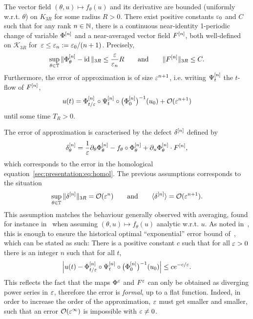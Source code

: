 \begin{assumption} \label{hyp:exist_avg_nl} %
  The vector field $(\theta , u) \mapsto f_\theta(u)$ and its derivative
  are bounded (uniformly w.r.t. $\theta$) on $K_{3R}$ for some radius $R >
  0$. There exist positive constants $\varepsilon_0$ and $C$ such that for
  any rank $n \in \mathbb{N}$, there is a continuous near-identity 1-periodic
  change of variable $\Phi^{[n]}$ and a near-averaged vector field $F^{[n]}$, both well-defined on $\mathcal{K}_{3R}$ for~$\varepsilon \leq \varepsilon_n :=
  \varepsilon_0 / (n+1)$. Precisely,
  \begin{equation*}
    \sup_{\theta \in \mathbb{T}} \| \Phi^{[n]}_\theta - \operatorname{id} \| _{3R} 
      \leq \frac{\varepsilon}{\varepsilon_n} R
    \qquad\text{and}\qquad
    \| F^{[n]} \|_{3R} \leq C .
  \end{equation*}
  Furthermore, the error of approximation is of size $\varepsilon^{n+1}$, i.e.
  writing $\Psi^{[n]} _t$ the $t$-flow of $F^{[n]}$, 
  \begin{equation} \label{sec:approx:def:avg_approx}
    u(t) = \Phi^{[n]} _{t/\varepsilon} \circ \Psi^{[n]} _t \circ \big( \Phi^{[n]} _0
    \big)^{-1} (u_0) + \mathcal{O}(\varepsilon^{n+1}) 
  \end{equation}
  until some time $T_R > 0$. 
\end{assumption}
The error of approximation is caracterised by the defect $\delta^{[n]}$
defined by 
\begin{equation*} 
  \delta^{[n]} _{\theta} 
  = \frac{1}{\varepsilon} \partial_\theta \Phi^{[n]} _\theta
    - f_\theta \circ \Phi^{[n]} _\theta 
    + \partial_u \Phi^{[n]} _\theta \cdot F^{[n]} , 
\end{equation*}
which corresponds to the error in the homological
equation~\eqref{sec:presentation:eq:homol}. The previous assumptions
corresponds to the situation
\begin{equation} \label{sec:approx:hyp:delta}
  \sup_{\theta \in \mathbb{T}} \| \delta^{[n]} \| _{3R} = \mathcal{O}( \varepsilon^n )
  \qquad\text{and}\qquad
  \langle \delta^{[n]} \rangle = \mathcal{O}( \varepsilon^{n+1} ) .
\end{equation}
%
This assumption matches the behaviour generally observed with averaging,
found for instance in~\cite{castella.2015.stroboscopic} when assuming
$(\theta,u) \mapsto f_\theta(u)$ analytic w.r.t. $u$. As noted
in~\cite{chartier.2015.higher}, this is enough to ensure the historical
optimal ``exponential'' error bound of~\cite{neishtadt.1984.separation},
which can be stated as such: There is a positive constant $c$ such that for
all $\varepsilon > 0$ there is an integer $n$ such that for all $t$,
\begin{equation*}
  \left| u(t) - \Phi^{[n]} _{t/\varepsilon} \circ \Psi^{[n]}_t 
  \circ \big( \Phi^{[n]} _0 \big)^{-1} (u_0) \right| 
  \leq c e^{-c/\varepsilon} .
\end{equation*}
This reflects the fact that the maps $\Phi^{\varepsilon}$ and $F^{\varepsilon}$ can only be
obtained as diverging power series in $\varepsilon$, therefore the error is
\textit{formal}, up to a flat function. Indeed, in order to increase the
order of the approximation, $\varepsilon$ must get smaller and smaller, such that
an error $\mathcal{O}( \varepsilon^\infty )$ is impossible with $\varepsilon \neq 0$. 

